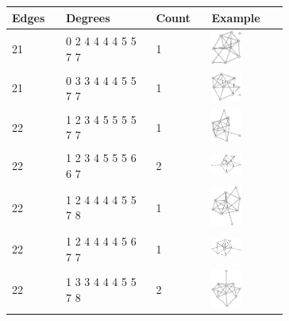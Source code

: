 \begin{table}[h!]
\centering
\footnotesize
\begin{tabular}{m{0.12\linewidth} m{0.25\linewidth} m{0.12\linewidth} m{0.2\linewidth}}
 \toprule
    Edges & Degrees & Count & Example\\ [0.5ex]
 \midrule
21 & 0 2 4 4 4 4 5 5 7 7 & 1 & \includegraphics[width=1cm]{15-universal-graphs/img/degree-sequences-example-graphs/graph-5-10-0} \\
21 & 0 3 3 4 4 4 5 5 7 7 & 1 & \includegraphics[width=1cm]{15-universal-graphs/img/degree-sequences-example-graphs/graph-5-10-1} \\
22 & 1 2 3 4 5 5 5 5 7 7 & 1 & \includegraphics[width=1cm]{15-universal-graphs/img/degree-sequences-example-graphs/graph-5-10-2} \\
22 & 1 2 3 4 5 5 5 6 6 7 & 2 & \includegraphics[width=1cm]{15-universal-graphs/img/degree-sequences-example-graphs/graph-5-10-3} \\
22 & 1 2 4 4 4 4 5 5 7 8 & 1 & \includegraphics[width=1cm]{15-universal-graphs/img/degree-sequences-example-graphs/graph-5-10-4} \\
22 & 1 2 4 4 4 4 5 6 7 7 & 1 & \includegraphics[width=1cm]{15-universal-graphs/img/degree-sequences-example-graphs/graph-5-10-5} \\
22 & 1 3 3 4 4 4 5 5 7 8 & 2 & \includegraphics[width=1cm]{15-universal-graphs/img/degree-sequences-example-graphs/graph-5-10-6} \\

\end{tabular}
\end{table}
